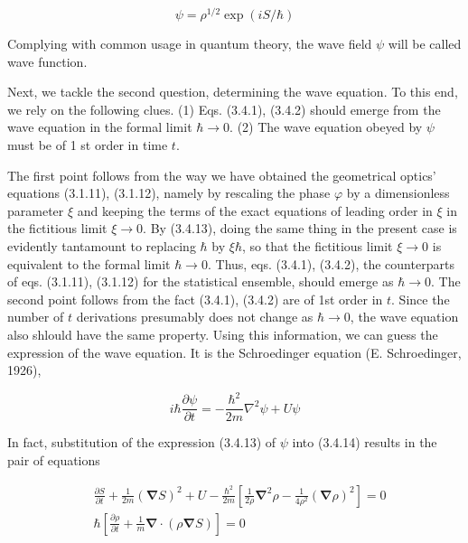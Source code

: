 \documentclass{article}
\begin{document}
\begin{equation*}
\psi=\rho^{1 / 2} \exp (i S / \hbar) \tag{3.4.13}
\end{equation*}
 

Complying with common usage in quantum theory, the wave field $\psi$ will be called wave function.

Next, we tackle the second question, determining the wave equation. To this end, we rely on the following clues.
(1) Eqs. (3.4.1), (3.4.2) should emerge from the wave equation in the formal limit $\hbar \rightarrow 0$.
(2) The wave equation obeyed by $\psi$ must be of 1 st order in time $t$.

The first point follows from the way we have obtained the geometrical optics' equations (3.1.11), (3.1.12), namely by rescaling the phase $\varphi$ by a dimensionless parameter $\xi$ and keeping the terms of the exact equations of leading order in $\xi$ in the fictitious limit $\xi \rightarrow 0$. By (3.4.13), doing the same thing in the present case is evidently tantamount to replacing $\hbar$ by $\xi \hbar$, so that the fictitious limit $\xi \rightarrow 0$ is equivalent to the formal limit $\hbar \rightarrow 0$. Thus, eqs. (3.4.1), (3.4.2), the counterparts of eqs. (3.1.11), (3.1.12) for the statistical ensemble, should emerge as $\hbar \rightarrow 0$. The second point follows from the fact (3.4.1), (3.4.2) are of 1st order in $t$. Since the number of $t$ derivations presumably does not change as $\hbar \rightarrow 0$, the wave equation also shlould have the same property. Using this information, we can guess the expression of the wave equation. It is the Schroedinger equation (E. Schroedinger, 1926),
 
\begin{equation*}
i \hbar \frac{\partial \psi}{\partial t}=-\frac{\hbar^{2}}{2 m} \nabla^{2} \psi+U \psi \tag{3.4.14}
\end{equation*}
 

In fact, substitution of the expression (3.4.13) of $\psi$ into (3.4.14) results in the pair of equations
 
\begin{align*}
& \frac{\partial S}{\partial t}+\frac{1}{2 m}(\boldsymbol{\nabla} S)^{2}+U-\frac{\hbar^{2}}{2 m}\left[\frac{1}{2 \rho} \boldsymbol{\nabla}^{2} \rho-\frac{1}{4 \rho^{2}}(\boldsymbol{\nabla} \rho)^{2}\right]=0  \tag{3.4.15}\\
& \hbar\left[\frac{\partial \rho}{\partial t}+\frac{1}{m} \boldsymbol{\nabla} \cdot(\rho \boldsymbol{\nabla} S)\right]=0 \tag{3.4.16}
\end{align*}
 
\end{document}
